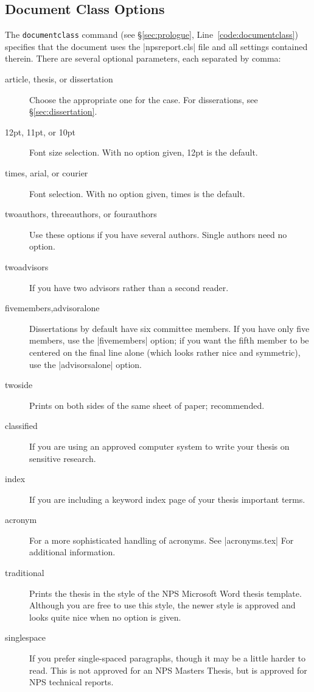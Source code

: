 \subsection{Document Class Options}\label{sec:documentclass}
The \verb|documentclass| command (see \S\ref{sec:prologue}, Line~\ref{code:documentclass}) 
specifies that the document uses the |npsreport.cls|
  file and all settings contained therein.  There are  several optional
  parameters, each separated by comma: 
  \begin{description}
    \item[article, thesis, or dissertation] Choose the appropriate one 
    for the case. For disserations, see \S\ref{sec:dissertation}.
    \item[12pt, 11pt, or 10pt] Font size selection.  With no option given, 12pt is the default.
    \item[times, arial, or courier]  Font selection.  With no option given, times is the default.
    \item[twoauthors, threeauthors, or fourauthors] Use these options if you have 
    several authors.  Single authors need no option. 
    \item[twoadvisors] If you have two advisors rather than a second reader. 
    \item[fivemembers,advisoralone] Dissertations by default have six committee members. 
    If you have only five members, use the |fivemembers| option; if you want the fifth member
    to be centered on the final line alone (which looks rather nice and symmetric), use the |advisorsalone| option.
    \item[twoside] Prints on both sides of the same sheet of paper; recommended.
    \item[classified] If you are using an approved computer system to 
    write your thesis on sensitive research.
    \item[index] If you are including a keyword index page of your 
    thesis important terms.
    \item[acronym] For a more sophisticated handling of acronyms.  See 
    |acronyms.tex| For additional information.
    \item[traditional] Prints the thesis in the style of the NPS
      Microsoft Word thesis template. Although you are free to use
      this style, the newer style is approved and looks quite nice 
    when no option is given.
    \item[singlespace] If you prefer single-spaced paragraphs, though it 
    may be a little harder to read. This is not approved for an NPS
    Masters Thesis, but is approved for NPS technical reports.
  \end{description}

